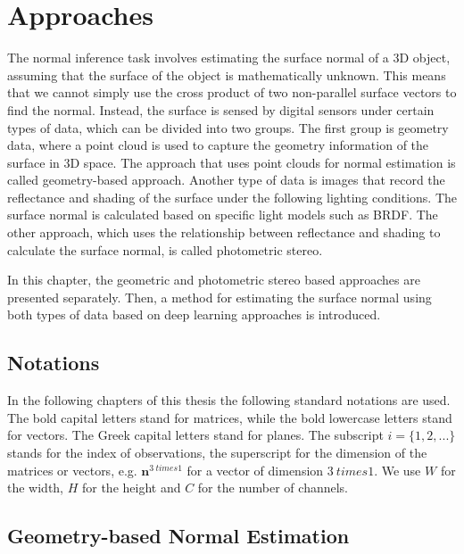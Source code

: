 \chapter{Approaches} %

\label{ch:03} %

The normal inference task involves estimating the surface normal of a 3D object, assuming that the surface of the object is mathematically unknown. This means that we cannot simply use the cross product of two non-parallel surface vectors to find the normal. Instead, the surface is sensed by digital sensors under certain types of data, which can be divided into two groups. The first group is geometry data, where a point cloud is used to capture the geometry information of the surface in 3D space. The approach that uses point clouds for normal estimation is called geometry-based approach.
Another type of data is images that record the reflectance and shading of the surface under the following lighting conditions. The surface normal is calculated based on specific light models such as BRDF. The other approach, which uses the relationship between reflectance and shading to calculate the surface normal, is called photometric stereo.

In this chapter, the geometric and photometric stereo based approaches are presented separately. Then, a method for estimating the surface normal using both types of data based on deep learning approaches is introduced.





\section{Notations}

In the following chapters of this thesis the following standard notations are used. The bold capital letters stand for matrices, while the bold lowercase letters stand for vectors. The Greek capital letters stand for planes.
The subscript $ i= \{1,2,...\} $ stands for the index of observations, the superscript for the dimension of the matrices or vectors, e.g. $ \textbf{n}^{3\ times 1} $ for a vector of dimension $ 3\ times 1 $. We use $ W $ for the width, $ H $ for the height and $ C $ for the number of channels.


\section{Geometry-based Normal Estimation}

